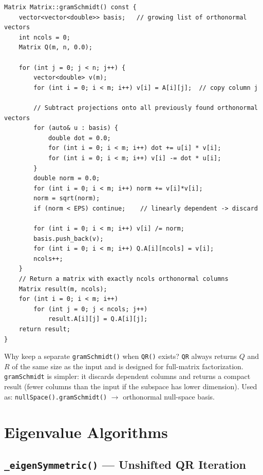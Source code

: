 \documentclass[12pt, a4paper]{article}
\newcommand{\code}[1]{\texttt{\small#1}}
\newcommand{\fn}[1]{\texttt{\small\color{funcgreen}#1}}
\begin{document}
\begin{lstlisting}
Matrix Matrix::gramSchmidt() const {
    vector<vector<double>> basis;   // growing list of orthonormal vectors
    int ncols = 0;
    Matrix Q(m, n, 0.0);

    for (int j = 0; j < n; j++) {
        vector<double> v(m);
        for (int i = 0; i < m; i++) v[i] = A[i][j];  // copy column j

        // Subtract projections onto all previously found orthonormal vectors
        for (auto& u : basis) {
            double dot = 0.0;
            for (int i = 0; i < m; i++) dot += u[i] * v[i];
            for (int i = 0; i < m; i++) v[i] -= dot * u[i];
        }
        double norm = 0.0;
        for (int i = 0; i < m; i++) norm += v[i]*v[i];
        norm = sqrt(norm);
        if (norm < EPS) continue;    // linearly dependent -> discard

        for (int i = 0; i < m; i++) v[i] /= norm;
        basis.push_back(v);
        for (int i = 0; i < m; i++) Q.A[i][ncols] = v[i];
        ncols++;
    }
    // Return a matrix with exactly ncols orthonormal columns
    Matrix result(m, ncols);
    for (int i = 0; i < m; i++)
        for (int j = 0; j < ncols; j++)
            result.A[i][j] = Q.A[i][j];
    return result;
}
\end{lstlisting}

\begin{notebox}{Why keep a separate \fn{gramSchmidt()} when \fn{QR()} exists?}
\fn{QR} always returns $Q$ and $R$ of the same size as the input and is
designed for full-matrix factorization.  \fn{gramSchmidt} is simpler: it
discards dependent columns and returns a compact result (fewer columns than the
input if the subspace has lower dimension).  Used as:
\code{nullSpace().gramSchmidt()} $\to$ orthonormal null-space basis.
\end{notebox}

\section{Eigenvalue Algorithms}

\subsection{\fn{\_eigenSymmetric()} --- Unshifted QR Iteration}
\end{document}
